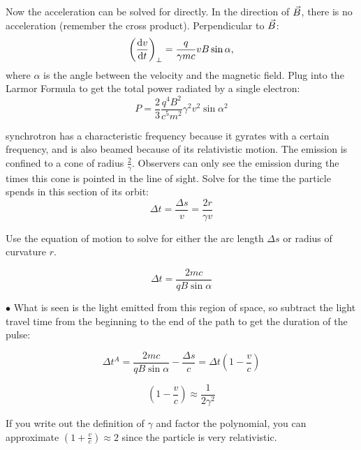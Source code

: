 \begin{enumerate}
      Now the acceleration can be solved for directly. In the direction of $\vec B$,
      there is no acceleration (remember the cross product). Perpendicular to $\vec B$:
      \begin{equation}
        \left(\frac{{\rm d} v}{{\rm d} t}\right)_{\perp} = \frac{q}{\gamma mc} vB \sin{\alpha},
      \end{equation}
      where $\alpha$ is the angle between the velocity and the magnetic field.
      Plug into the Larmor Formula to get the total power radiated by a single electron:
      \begin{equation}\boxed{
        P = \frac{2}{3} \frac{q^{4}B^{2}}{c^{5}m^{2}} \gamma^{2} v^{2} \sin{\alpha}^{2}
      }\end{equation} 
      
       synchrotron has a characteristic frequency
      because it gyrates with a certain frequency, and is also beamed because of its
      relativistic motion. The emission is confined to a cone of radius $\frac{2}{\gamma}$.
      Observers can only see the emission during the times this cone is pointed in the line
      of sight. Solve for the time the particle spends in this section of its orbit:
      \begin{equation}
      \Delta t = \frac{\Delta s}{v} = \frac{2r}{\gamma v}
      \end{equation}
      
      Use the equation of motion to solve for either the arc length $\Delta s$ or radius of curvature $r$.
      
      \begin{equation}
      \Delta t = \frac{2mc}{qB\sin{\alpha}}
      \end{equation}
      
      $\bullet$ What is seen is the light emitted from this region of space, so subtract the light travel time from the beginning to the end of the path to get the duration of the pulse:
      
       \begin{equation}
      \Delta t^{A} = \frac{2mc}{qB\sin{\alpha}} - \frac{\Delta s}{c} = \Delta t (1 - \frac{v}{c})
      \end{equation}
      
      \begin{equation}
      (1 - \frac{v}{c}) \approx \frac{1}{2\gamma^{2}}
      \end{equation}
      
      If you write out the definition of $\gamma$ and factor the polynomial, you can approximate $(1 + \frac{v}{c}) \approx 2$ since the particle is very relativistic.
      

\end{enumerate}
